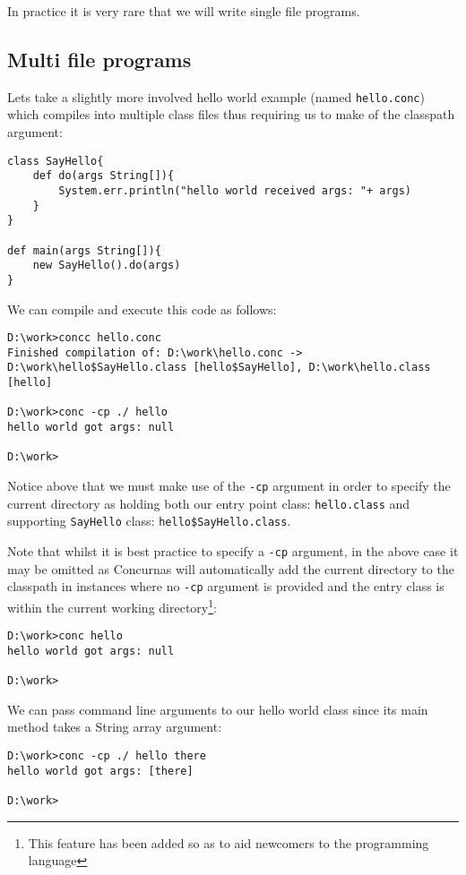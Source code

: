 \documentclass[conc-doc]{subfiles}
\begin{document}
In practice it is very rare that we will write single file programs.

\subsection{Multi file programs}
Lets take a slightly more involved hello world example (named \lstinline[language=None]{hello.conc}) which compiles into multiple class files thus requiring us to make of the classpath argument:

\begin{lstlisting}
class SayHello{
	def do(args String[]){
		System.err.println("hello world received args: "+ args)
	}
}

def main(args String[]){
	new SayHello().do(args)
}
\end{lstlisting}

We can compile and execute this code as follows:

\begin{lstlisting}[language=None]
D:\work>concc hello.conc
Finished compilation of: D:\work\hello.conc -> D:\work\hello$SayHello.class [hello$SayHello], D:\work\hello.class [hello]

D:\work>conc -cp ./ hello
hello world got args: null

D:\work>
\end{lstlisting}

Notice above that we must make use of the \lstinline[language=None]{-cp} argument in order to specify the current directory as holding both our entry point class: \lstinline{hello.class} and supporting \lstinline{SayHello} class: \lstinline{hello$SayHello.class}.

Note that whilst it is best practice to specify a \lstinline[language=None]{-cp} argument, in the above case it may be omitted as Concurnas will automatically add the current directory to the classpath in instances where no \lstinline[language=None]{-cp} argument is provided and the entry class is within the current working directory\footnote{This feature has been added so as to aid newcomers to the programming language}:

\begin{lstlisting}[language=None]
D:\work>conc hello
hello world got args: null

D:\work>
\end{lstlisting}

We can pass command line arguments to our hello world class since its main method takes a String array argument:
\begin{lstlisting}[language=None]
D:\work>conc -cp ./ hello there
hello world got args: [there]

D:\work>
\end{lstlisting}
\end{document}
